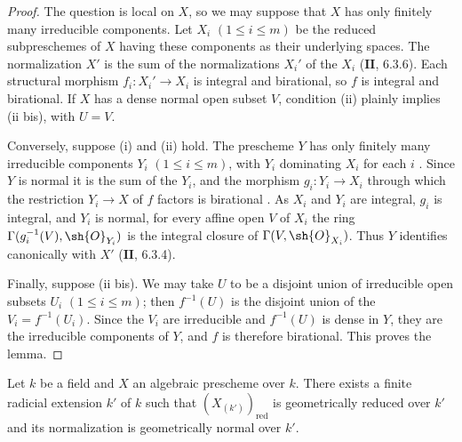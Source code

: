 \begin{proof}
The question is local on $X$, so we may suppose that $X$ has only finitely many irreducible components.  Let $X_i$ $(1\leq i\leq m)$ be the reduced subpreschemes of $X$ having these components as their underlying spaces.  The normalization $X'$ is the sum of the normalizations $X_i'$ of the $X_i$ ($\mathbf{II}$, 6.3.6).  Each structural morphism $f_i:X_i'\to X_i$ is integral and birational, so $f$ is integral and birational.  If $X$ has a dense normal open subset $V$, condition (ii) plainly implies (ii bis), with $U=V$.

Conversely, suppose (i) and (ii) hold.  The prescheme $Y$ has only finitely many irreducible components $Y_i$ $(1\leq i\leq m)$, with $Y_i$ dominating $X_i$ for each $i$ .  Since $Y$ is normal it is the sum of the $Y_i$, and the morphism $g_i:Y_i\to X_i$ through which the restriction $Y_i\to X$ of $f$ factors is birational .  As $X_i$ and $Y_i$ are integral, $g_i$ is integral, and $Y_i$ is normal, for every affine open $V$ of $X_i$ the ring $\Gamma(g_i^{-1}(V),\sh{O}_{Y_i})$ is the integral closure of $\Gamma(V,\sh{O}_{X_i})$.  Thus $Y$ identifies canonically with $X'$ ($\mathbf{II}$, 6.3.4).

Finally, suppose (ii bis).  We may take $U$ to be a disjoint union of irreducible open subsets $U_i$ $(1\leq i\leq m)$; then $f^{-1}(U)$ is the disjoint union of the $V_i=f^{-1}(U_i)$.  Since the $V_i$ are irreducible and $f^{-1}(U)$ is dense in $Y$, they are the irreducible components of $Y$, and $f$ is therefore birational.  This proves the lemma.
\end{proof}

\begin{lemma}[17.15.14.2]
\label{IV.17.15.14.2}
Let $k$ be a field and $X$ an algebraic prescheme over $k$.  There exists a finite radicial extension $k'$ of $k$ such that $(X_{(k')})_{\mathrm{red}}$ is geometrically reduced over $k'$ and its normalization is geometrically normal over $k'$.
\end{lemma}

